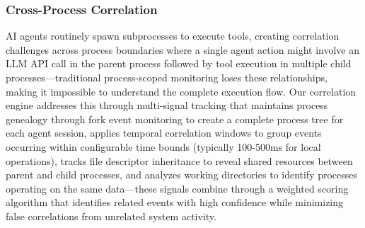 \subsubsection{Cross-Process Correlation}

AI agents routinely spawn subprocesses to execute tools, creating correlation challenges across process boundaries where a single agent action might involve an LLM API call in the parent process followed by tool execution in multiple child processes—traditional process-scoped monitoring loses these relationships, making it impossible to understand the complete execution flow. Our correlation engine addresses this through multi-signal tracking that maintains process genealogy through fork event monitoring to create a complete process tree for each agent session, applies temporal correlation windows to group events occurring within configurable time bounds (typically 100-500ms for local operations), tracks file descriptor inheritance to reveal shared resources between parent and child processes, and analyzes working directories to identify processes operating on the same data—these signals combine through a weighted scoring algorithm that identifies related events with high confidence while minimizing false correlations from unrelated system activity.